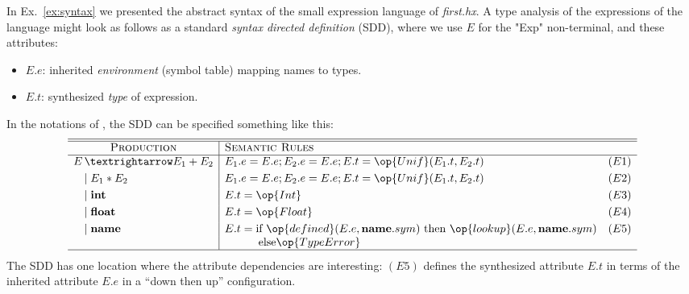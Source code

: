 \documentclass[11pt]{article} %
\begin{document}
\begin{example}\label{ex:analysis}
  In Ex.~\ref{ex:syntax} we presented the abstract syntax of the small expression language of
  \emph{first.hx}. A type analysis of the expressions of the language might look as follows as a
  standard \emph{syntax directed definition} (SDD), where we use $E$ for the "Exp" non-terminal, and
  these attributes:
  \begin{itemize}
  \item $E.e$: inherited \emph{environment} (\aka symbol table) mapping names to types.
  \item $E.t$: synthesized \emph{type} of expression.
  \end{itemize}
  In the notations of \cite{Aho+:2006}, the SDD can be specified something like this:
  \begin{equation*}
    \begin{array}{r@{\,}l|lr}
      \hline
      \hline
      \multicolumn{2}{c|}{\textsc{Production}}  & \textsc{Semantic Rules} &\\
      \hline
      E &→ E_1 + E_2 & E_1.e=E.e; E_2.e=E.e; E.t = \op{Unif}(E_1.t, E_2.t) &(E1)\\[\jot]
      &\mid E_1 \ast E_2 & E_1.e=E.e; E_2.e=E.e; E.t = \op{Unif}(E_1.t, E_2.t) &(E2)\\[\jot]
      &\mid \textbf{int} & E.t = \op{Int}&(E3)\\[\jot]
      &\mid \textbf{float} & E.t = \op{Float}&(E4)\\[\jot]
      &\mid \textbf{name} & E.t = \text{if}~\op{defined}(E.e,\textbf{name}.sym)~\text{then}~\op{lookup}(E.e,\textbf{name}.sym)&(E5)\\
      && \qquad\quad\text{else} \op{TypeError}\\
      \hline
    \end{array}
  \end{equation*}
  The SDD has one location where the attribute dependencies are interesting: $(E5)$ defines the
  synthesized attribute $E.t$ in terms of the inherited attribute $E.e$ in a ``down then up''
  configuration.
\end{example}
\end{document}
